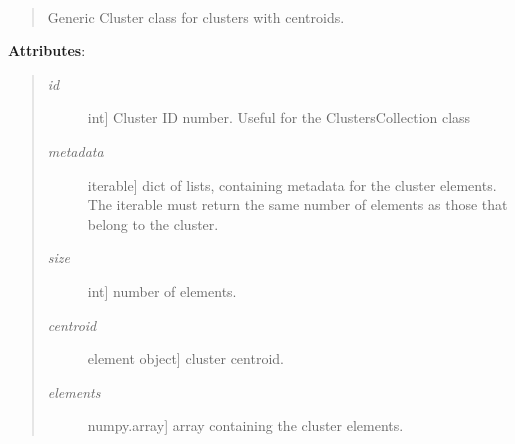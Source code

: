 \documentclass[letterpaper,10pt,english]{sphinxmanual}
\begin{document}
\begin{fulllineitems}
\label{index:encore.clustering.Cluster.Cluster}~\begin{quote}

Generic Cluster class for clusters with centroids.
\end{quote}

\textbf{Attributes}:
\begin{quote}
\begin{description}
\item[{\emph{id}}] \leavevmode{[}int{]}
Cluster ID number. Useful for the ClustersCollection class

\item[{\emph{metadata}}] \leavevmode{[}iterable{]}
dict of lists, containing metadata for the cluster elements. The iterable must return the same number of elements as those that belong to the cluster.

\item[{\emph{size}}] \leavevmode{[}int{]}
number of elements.

\item[{\emph{centroid}}] \leavevmode{[}element object{]}
cluster centroid.

\item[{\emph{elements}}] \leavevmode{[}numpy.array{]}
array containing the cluster elements.

\end{description}
\end{quote}

\begin{fulllineitems}
\label{index:encore.clustering.Cluster.Cluster.add_metadata}
\end{fulllineitems}


\end{fulllineitems}

\end{document}
